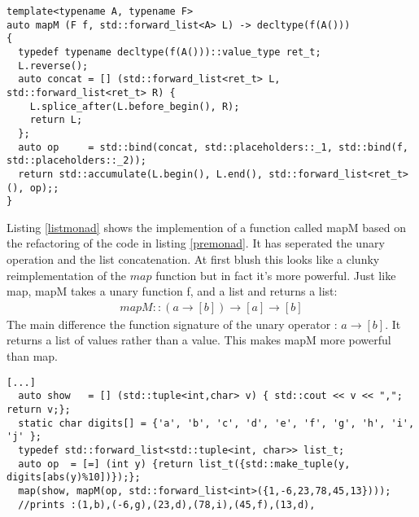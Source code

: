 \documentclass[12pt,fleqn]{article}
\begin{document}
%
\begin{comment}
%
\begin{lstlisting}[caption=unary operation and reduce,label=premonad2]
  [...]	
  typedef std::forward_list<int> list_t;
  list_t L         = {1,-6,23,78,45,13};
  auto op       = [] (int y) {return list_t({2*y+1});};
  auto concat = [] (list_t A, list_t B) { A.splice_after(A.before_begin(), B); return A;};
  auto bind    = std::bind(concat, std::placeholders::_1, std::bind(op, std::placeholders::_2));
  auto show   = [] (int v) { std::cout << v << ","; return v;};
  auto res       = std::accumulate(L.begin(), L.end(), list_t(), bind);
  map(show, res); //prints 27,91,157,47,-11,3,(i.e reverse order)
\end{lstlisting}
%
Listing \ref{premonad2} re-factors the code in listing \ref{premonad} by separating the unary operation and the list concatenation.
%
\end{comment}
\begin{lstlisting}[caption=the list monad, label=listmonad]
  template<typename A, typename F>
auto mapM (F f, std::forward_list<A> L) -> decltype(f(A()))
{
  typedef typename decltype(f(A()))::value_type ret_t;
  L.reverse();
  auto concat = [] (std::forward_list<ret_t> L, std::forward_list<ret_t> R) { 
    L.splice_after(L.before_begin(), R); 
    return L;
  };
  auto op     = std::bind(concat, std::placeholders::_1, std::bind(f, std::placeholders::_2));
  return std::accumulate(L.begin(), L.end(), std::forward_list<ret_t>(), op);;
}
\end{lstlisting}
%
Listing \ref{listmonad} shows the implemention of a function called mapM based on the refactoring of the code in listing \ref{premonad}.
It has seperated the unary operation and the list concatenation.
At first blush this looks like a clunky reimplementation of the $map$ function but in fact it's more powerful.
Just like map, mapM takes a unary function f, and a list and returns a list:
\begin{eqnarray*}
mapM :: (a \rightarrow [b]) \rightarrow [a] \rightarrow [b]
\end{eqnarray*}
The main difference the function signature of the unary operator : $a \rightarrow [b]$. 
It returns a list of values rather than a value. 
This makes mapM more powerful than map.
%
\begin{lstlisting}[caption=example of mapM, label=mapM] 
[...]
  auto show   = [] (std::tuple<int,char> v) { std::cout << v << ","; return v;};
  static char digits[] = {'a', 'b', 'c', 'd', 'e', 'f', 'g', 'h', 'i', 'j' };
  typedef std::forward_list<std::tuple<int, char>> list_t;
  auto op  = [=] (int y) {return list_t({std::make_tuple(y, digits[abs(y)%10])});};
  map(show, mapM(op, std::forward_list<int>({1,-6,23,78,45,13})));
  //prints :(1,b),(-6,g),(23,d),(78,i),(45,f),(13,d),
\end{lstlisting}
\end{document}
